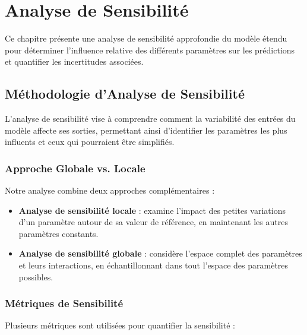 \chapter{Analyse de Sensibilité}
\label{chap:analyse_sensibilite}

Ce chapitre présente une analyse de sensibilité approfondie du modèle étendu pour déterminer l'influence relative des différents paramètres sur les prédictions et quantifier les incertitudes associées.

\section{Méthodologie d'Analyse de Sensibilité}
\label{sec:methodologie_sensibilite}

L'analyse de sensibilité vise à comprendre comment la variabilité des entrées du modèle affecte ses sorties, permettant ainsi d'identifier les paramètres les plus influents et ceux qui pourraient être simplifiés.

\subsection{Approche Globale vs. Locale}
\label{subsec:approche_globale_locale}

Notre analyse combine deux approches complémentaires :

\begin{itemize}
\item \textbf{Analyse de sensibilité locale} : examine l'impact des petites variations d'un paramètre autour de sa valeur de référence, en maintenant les autres paramètres constants.
\item \textbf{Analyse de sensibilité globale} : considère l'espace complet des paramètres et leurs interactions, en échantillonnant dans tout l'espace des paramètres possibles.
\end{itemize}

\subsection{Métriques de Sensibilité}
\label{subsec:metriques_sensibilite}

Plusieurs métriques sont utilisées pour quantifier la sensibilité :

